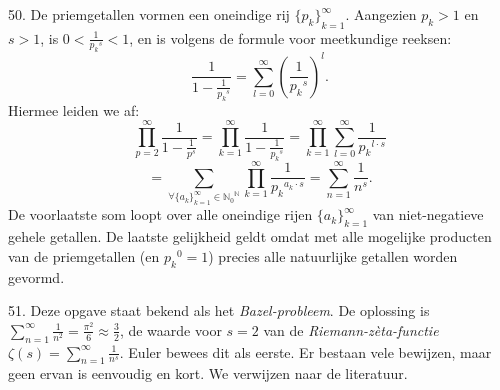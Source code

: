 \clearpage

\begin{problem}{50.}
    De priemgetallen vormen een oneindige rij ${\{p_k\}}_{k=1}^{\infty}$. Aangezien $p_k > 1$ en $s > 1$, is $0 < \frac{1}{{p_k}^s} < 1$, en is volgens de formule voor meetkundige reeksen:
    \begin{equation*}
        \frac{1}{1 - \frac{1}{{p_k}^s}} = \textstyle\sum\limits_{l=0}^{\infty} {\left( \frac{1}{{p_k}^s} \right)}^l.
    \end{equation*}
    Hiermee leiden we af:
    \begin{equation*}
        \textstyle\prod\limits_{p=2}^{\infty} \frac{1}{1 - \frac{1}{p^s}} = \textstyle\prod\limits_{k=1}^{\infty} \frac{1}{1 - \frac{1}{{p_k}^s}} = \textstyle\prod\limits_{k=1}^{\infty} \textstyle\sum\limits_{l=0}^{\infty} \frac{1}{{p_k}^{l \cdot s}}
    \end{equation*}
    \begin{equation*}
        = \textstyle\sum\limits_{\forall {\{a_k\}}_{k=1}^{\infty} \in {\mathbb{N}_0}^\mathbb{N}} \textstyle\prod\limits_{k=1}^{\infty} \frac{1}{{p_k}^{a_k \cdot s}} = \textstyle\sum\limits_{n=1}^{\infty} \frac{1}{n^s}.
    \end{equation*}
    De voorlaatste som loopt over alle oneindige rijen ${\{a_k\}}_{k=1}^{\infty}$ van niet-negatieve gehele getallen. De laatste gelijkheid geldt omdat met alle mogelijke producten van de priemgetallen (en ${p_{k}}^0 = 1$) precies alle natuurlijke getallen worden gevormd.
\end{problem}

\begin{problem}{51.}
    Deze opgave staat bekend als het \textit{Bazel-probleem}. De oplossing is $\sum\limits_{n=1}^{\infty} \frac{1}{n^2} = \frac{\pi^2}{6} \approx \frac{3}{2}$, de waarde voor $s = 2$ van de \textit{Riemann-zèta-functie} $\zeta (s) = \sum\limits_{n=1}^{\infty} \frac{1}{n^s}$. Euler bewees dit als eerste. Er bestaan vele bewijzen, maar geen ervan is eenvoudig en kort. We verwijzen naar de literatuur.
\end{problem}

\clearpage

